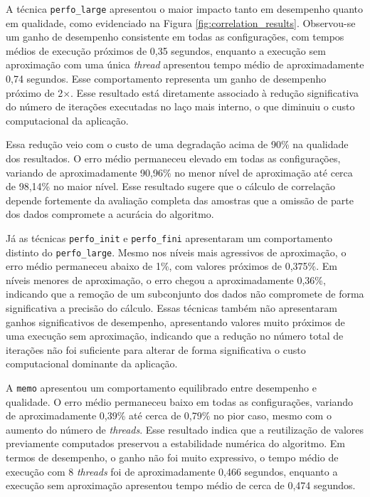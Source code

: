 A técnica \texttt{perfo\_large} apresentou o maior impacto tanto em desempenho quanto em qualidade, como evidenciado na Figura \ref{fig:correlation_results}. Observou-se um ganho de desempenho consistente em todas as configurações, com tempos médios de execução próximos de 0,35 segundos, enquanto a execução sem aproximação com uma única \textit{thread} apresentou tempo médio de aproximadamente 0,74 segundos. Esse comportamento representa um ganho de desempenho próximo de 2$\times$. Esse resultado está diretamente associado à redução significativa do número de iterações executadas no laço mais interno, o que diminuiu o custo computacional da aplicação.

Essa redução veio com o custo de uma degradação acima de 90\% na qualidade dos resultados. O erro médio permaneceu elevado em todas as configurações, variando de aproximadamente 90,96\% no menor nível de aproximação até cerca de 98,14\% no maior nível. Esse resultado sugere que o cálculo de correlação depende fortemente da avaliação completa das amostras que a omissão de parte dos dados compromete a acurácia do algoritmo.

Já as técnicas \texttt{perfo\_init} e \texttt{perfo\_fini} apresentaram um comportamento distinto do \texttt{perfo\_large}. Mesmo nos níveis mais agressivos de aproximação, o erro médio permaneceu abaixo de 1\%, com valores próximos de 0,375\%. Em níveis menores de aproximação, o erro chegou a aproximadamente 0,36\%, indicando que a remoção de um subconjunto dos dados não compromete de forma significativa a precisão do cálculo. Essas técnicas também não apresentaram ganhos significativos de desempenho, apresentando valores muito próximos de uma execução sem aproximação, indicando que a redução no número total de iterações não foi suficiente para alterar de forma significativa o custo computacional dominante da aplicação.

A \texttt{memo} apresentou um comportamento equilibrado entre desempenho e qualidade. O erro médio permaneceu baixo em todas as configurações, variando de aproximadamente 0,39\% até cerca de 0,79\% no pior caso, mesmo com o aumento do número de \textit{threads}. Esse resultado indica que a reutilização de valores previamente computados preservou a estabilidade numérica do algoritmo. Em termos de desempenho, o ganho não foi muito expressivo, o tempo médio de execução com 8 \textit{threads} foi de aproximadamente 0,466 segundos, enquanto a execução sem aproximação apresentou tempo médio de cerca de 0,474 segundos.

